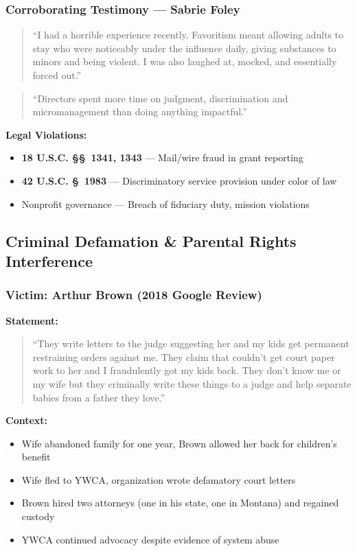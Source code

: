 \documentclass[11pt,letterpaper]{article}
\newcommand{\statref}[1]{\textbf{\color{NavyBlue}#1}}
\begin{document}
\subsubsection{Corroborating Testimony --- Sabrie Foley}
\begin{quote}
``I had a horrible experience recently. Favoritism meant allowing adults to stay who were noticeably under the influence daily, giving substances to minors and being violent. I was also laughed at, mocked, and essentially forced out.''
\end{quote}

\begin{quote}
``Directors spent more time on judgment, discrimination and micromanagement than doing anything impactful.''
\end{quote}

\textbf{Legal Violations:}
\begin{itemize}[leftmargin=*]
\item \statref{18 U.S.C. \S\S~1341, 1343} --- Mail/wire fraud in grant reporting
\item \statref{42 U.S.C. \S~1983} --- Discriminatory service provision under color of law
\item Nonprofit governance --- Breach of fiduciary duty, mission violations
\end{itemize}

\subsection{Criminal Defamation \& Parental Rights Interference}

\subsubsection{Victim: Arthur Brown (2018 Google Review)}

\textbf{Statement:}
\begin{quote}
``They write letters to the judge suggesting her and my kids get permanent restraining orders against me. They claim that couldn't get court paper work to her and I fraudulently got my kids back. They don't know me or my wife but they criminally write these things to a judge and help separate babies from a father they love.''
\end{quote}

\textbf{Context:}
\begin{itemize}[leftmargin=*]
\item Wife abandoned family for one year, Brown allowed her back for children's benefit
\item Wife fled to YWCA, organization wrote defamatory court letters
\item Brown hired two attorneys (one in his state, one in Montana) and regained custody
\item YWCA continued advocacy despite evidence of system abuse
\end{itemize}
\end{document}
